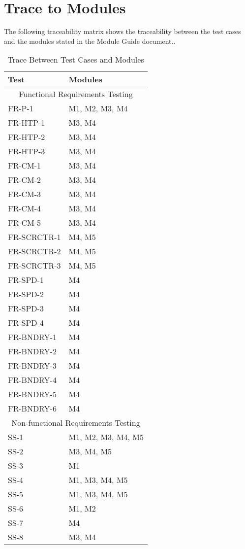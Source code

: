 \documentclass[12pt, titlepage]{article}
\begin{document}
\section{Trace to Modules}		
The following traceability matrix shows the traceability between the test cases and the modules stated in the Module Guide document..

\begin{table}[H]
\centering
\begin{tabular}{p{} p{}}
\toprule
\textbf{Test} & \textbf{Modules}\\
\midrule
\multicolumn{2}{c}{Functional Requirements Testing} \\
\midrule
FR-P-1 & M1, M2, M3, M4\\ 
FR-HTP-1 & M3, M4\\
FR-HTP-2  & M3, M4\\
FR-HTP-3  & M3, M4\\
FR-CM-1  & M3, M4\\
FR-CM-2 & M3, M4\\
FR-CM-3 & M3, M4\\
FR-CM-4 & M3, M4\\
FR-CM-5 & M3, M4\\
FR-SCRCTR-1 & M4, M5\\
FR-SCRCTR-2  & M4, M5\\
FR-SCRCTR-3  & M4, M5\\
FR-SPD-1  & M4\\
FR-SPD-2  & M4\\
FR-SPD-3 & M4\\
FR-SPD-4 & M4\\
FR-BNDRY-1 & M4\\
FR-BNDRY-2 & M4\\
FR-BNDRY-3 & M4\\
FR-BNDRY-4 & M4\\
FR-BNDRY-5 & M4\\
FR-BNDRY-6 & M4\\
\midrule
\multicolumn{2}{c}{Non-functional Requirements Testing} \\
\midrule
SS-1 & M1, M2, M3, M4, M5\\
SS-2 & M3, M4, M5\\
SS-3 & M1\\
SS-4 & M1, M3, M4, M5\\
SS-5 & M1, M3, M4, M5\\
SS-6 & M1, M2\\
SS-7 & M4\\
SS-8 & M3, M4\\
\bottomrule
\end{tabular}

\caption{Trace Between Test Cases and Modules}
\label{TblRT}
\end{table}
\end{document}
